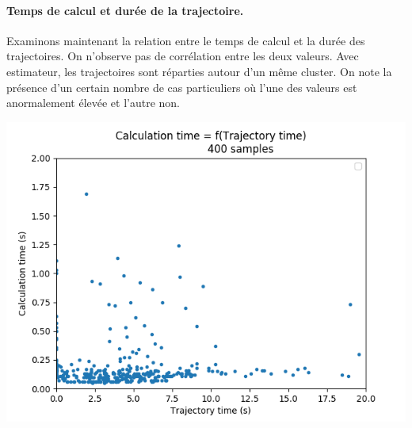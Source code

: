\documentclass[a4paper,12pt]{report}
\begin{document}
\paragraph{Temps de calcul et durée de la trajectoire.}
Examinons maintenant la relation entre le temps de calcul et la durée des trajectoires. On n'observe pas de corrélation entre les deux valeurs. Avec estimateur, les trajectoires sont réparties autour d'un même cluster. On note la présence d'un certain nombre de cas particuliers où l'une des valeurs est anormalement élevée et l'autre non.

\vspace{0.5cm}

\begin{minipage}[b]{0.45\textwidth}
	\begin{center}
		\includegraphics[width=1\linewidth]{images/calc_f(traj)_noinit.png}
		\label{fig:calc_f(euclid)_noinit} 
	\end{center}
\end{minipage}
\hfill
\end{document}
